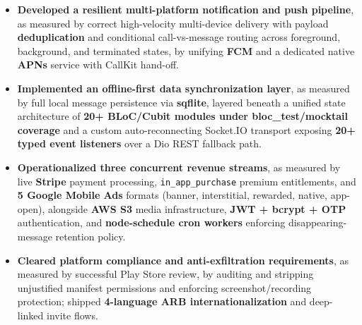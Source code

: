 \documentclass[10pt,letterpaper]{article}
\newenvironment{highlights}{
  \begin{itemize}[topsep=2pt,parsep=1pt,partopsep=0pt,itemsep=0pt,leftmargin=10pt]
}{\end{itemize}}
\begin{document}
\begin{highlights}
  \item \textbf{Developed a resilient multi-platform notification and push pipeline}, as measured by correct high-velocity multi-device delivery with payload \textbf{deduplication} and conditional call-vs-message routing across foreground, background, and terminated states, by unifying \textbf{FCM} and a dedicated native \textbf{APNs} service with CallKit hand-off.
  \item \textbf{Implemented an offline-first data synchronization layer}, as measured by full local message persistence via \textbf{sqflite}, layered beneath a unified state architecture of \textbf{20+ BLoC/Cubit modules under bloc\_test/mocktail coverage} and a custom auto-reconnecting Socket.IO transport exposing \textbf{20+ typed event listeners} over a Dio REST fallback path.
  \item \textbf{Operationalized three concurrent revenue streams}, as measured by live \textbf{Stripe} payment processing, \texttt{in\_app\_purchase} premium entitlements, and \textbf{5 Google Mobile Ads} formats (banner, interstitial, rewarded, native, app-open), alongside \textbf{AWS S3} media infrastructure, \textbf{JWT + bcrypt + OTP} authentication, and \textbf{node-schedule cron workers} enforcing disappearing-message retention policy.
  \item \textbf{Cleared platform compliance and anti-exfiltration requirements}, as measured by successful Play Store review, by auditing and stripping unjustified manifest permissions and enforcing screenshot/recording protection; shipped \textbf{4-language ARB internationalization} and deep-linked invite flows.
\end{highlights}

\vspace{3pt}
\end{document}
